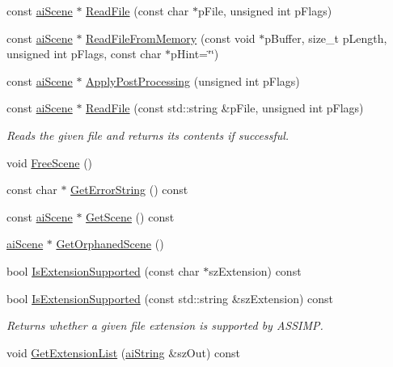 \begin{DoxyCompactItemize}
const \hyperlink{structaiScene}{ai\-Scene} $\ast$ \hyperlink{classAssimp_1_1Importer_a174418ab41d5b8bc51a044895cb991e5}{\-Read\-File} (const char $\ast$p\-File, unsigned int p\-Flags)
\item 
const \hyperlink{structaiScene}{ai\-Scene} $\ast$ \hyperlink{classAssimp_1_1Importer_a9b3c5e8b1042702f449e84a95b3324f6}{\-Read\-File\-From\-Memory} (const void $\ast$p\-Buffer, size\-\_\-t p\-Length, unsigned int p\-Flags, const char $\ast$p\-Hint=\char`\"{}\char`\"{})
\item 
const \hyperlink{structaiScene}{ai\-Scene} $\ast$ \hyperlink{classAssimp_1_1Importer_a5872e749c1451fee64183fc14f1fc81d}{\-Apply\-Post\-Processing} (unsigned int p\-Flags)
\item 
const \hyperlink{structaiScene}{ai\-Scene} $\ast$ \hyperlink{classAssimp_1_1Importer_a339882c7acb47d5b5110bbd078d870a9}{\-Read\-File} (const std\-::string \&p\-File, unsigned int p\-Flags)
\begin{DoxyCompactList}\small\item\em \-Reads the given file and returns its contents if successful. \end{DoxyCompactList}\item 
void \hyperlink{classAssimp_1_1Importer_a53dafc3046abc33365a07c605716c5d4}{\-Free\-Scene} ()
\item 
const char $\ast$ \hyperlink{classAssimp_1_1Importer_a23bab5ba8cb9b6886c690a610766668b}{\-Get\-Error\-String} () const 
\item 
const \hyperlink{structaiScene}{ai\-Scene} $\ast$ \hyperlink{classAssimp_1_1Importer_a26fd479a6a955969c1377fa59f92db66}{\-Get\-Scene} () const 
\item 
\hyperlink{structaiScene}{ai\-Scene} $\ast$ \hyperlink{classAssimp_1_1Importer_a60eb9042fb85bfbd61a863e131a56ecd}{\-Get\-Orphaned\-Scene} ()
\item 
bool \hyperlink{classAssimp_1_1Importer_a9146ea75c33c0aac0310195346877388}{\-Is\-Extension\-Supported} (const char $\ast$sz\-Extension) const 
\item 
bool \hyperlink{classAssimp_1_1Importer_a5b01905366f5bf8d1f89d51f755bf7d2}{\-Is\-Extension\-Supported} (const std\-::string \&sz\-Extension) const 
\begin{DoxyCompactList}\small\item\em \-Returns whether a given file extension is supported by \-A\-S\-S\-I\-M\-P. \end{DoxyCompactList}\item 
void \hyperlink{classAssimp_1_1Importer_a23c85647f7977012d9fef20b36c2d579}{\-Get\-Extension\-List} (\hyperlink{structaiString}{ai\-String} \&sz\-Out) const 

\end{DoxyCompactItemize}
